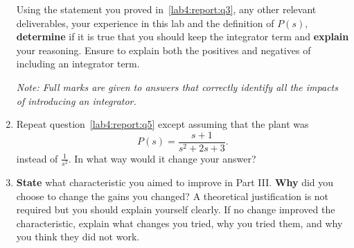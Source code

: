 \begin{deliverable}[label={lab4:report}]
\begin{enumerate}[label={(\arabic*)}]
{      Using the statement you proved in~\ref{lab4:report:q3}, any other relevant deliverables, your experience in this lab and the definition of \(P(s),\) \textbf{determine} if it is true that you should keep the integrator term and \textbf{explain} your reasoning. Ensure to explain both the positives and negatives of including an integrator term.

      \emph{Note: Full marks are given to answers that correctly identify all the impacts of introducing an integrator.}
      \label{lab4:report:q5}
    }
    \item{%
      Repeat question~\ref{lab4:report:q5} except assuming that the plant was
      \[
        P(s) = \frac{s + 1}{s^2 + 2 s + 3}.
      \]
      instead of \(\frac{1}{s^2}.\)
      In what way would it change your answer?
      \label{lab4:report:q6}
    }
    \item{%
      \textbf{State} what characteristic you aimed to improve in Part III.
      \textbf{Why} did you choose to change the gains you changed?
      A theoretical justification is not required but you should explain yourself clearly.
      If no change improved the characteristic, explain what changes you tried, why you tried them, and why you think they did not work.
      \label{lab4:report:q7}
    }
  \end{enumerate}
\end{deliverable}

